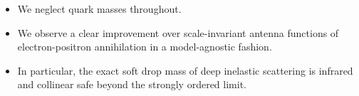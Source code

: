 \begin{itemize}
  \item We neglect quark masses throughout.
  \item We observe a clear improvement over scale-invariant antenna functions of electron-positron annihilation in a model-agnostic fashion.
  \item In particular, the exact soft drop mass of deep inelastic scattering is infrared and collinear safe beyond the strongly ordered limit.
\end{itemize}

